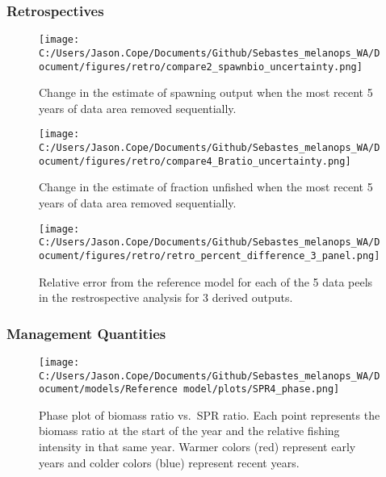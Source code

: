 \documentclass[11pt,
  english,
  letterpaper,
]{article}
\begin{document}
\newpage

\hypertarget{retrospectives}{%
\subsubsection{Retrospectives}\label{retrospectives}}

\begin{figure}
\centering
\texttt{[image: C:/Users/Jason.Cope/Documents/Github/Sebastes\_melanops\_WA/Document/figures/retro/compare2\_spawnbio\_uncertainty.png]}
\caption{Change in the estimate of spawning output when the most recent 5 years of data area removed sequentially.\label{fig:retro-ssb}}
\end{figure}

\pagebreak

\begin{figure}
\centering
\texttt{[image: C:/Users/Jason.Cope/Documents/Github/Sebastes\_melanops\_WA/Document/figures/retro/compare4\_Bratio\_uncertainty.png]}
\caption{Change in the estimate of fraction unfished when the most recent 5 years of data area removed sequentially.\label{fig:retro-depl}}
\end{figure}

\newpage

\begin{figure}
\centering
\texttt{[image: C:/Users/Jason.Cope/Documents/Github/Sebastes\_melanops\_WA/Document/figures/retro/retro\_percent\_difference\_3\_panel.png]}
\caption{Relative error from the reference model for each of the 5 data peels in the restrospective analysis for 3 derived outputs.\label{fig:retro-RE_comps}}
\end{figure}

\newpage

\hypertarget{management-quantities}{%
\subsubsection{Management Quantities}\label{management-quantities}}

\begin{figure}
\centering
\texttt{[image: C:/Users/Jason.Cope/Documents/Github/Sebastes\_melanops\_WA/Document/models/Reference model/plots/SPR4\_phase.png]}
\caption{Phase plot of biomass ratio vs.~SPR ratio. Each point represents the biomass ratio at the start of the year and the relative fishing intensity in that same year. Warmer colors (red) represent early years and colder colors (blue) represent recent years.\label{fig:phase}}
\end{figure}
\end{document}

